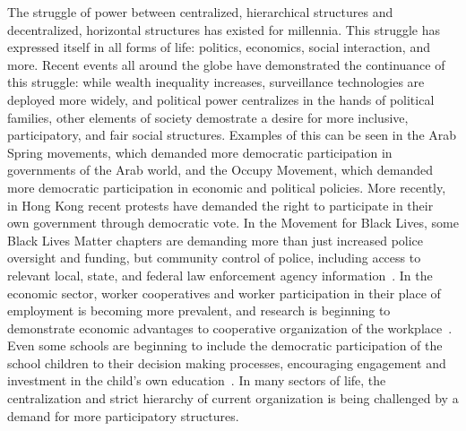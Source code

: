 The struggle of power between centralized, hierarchical structures and
decentralized, horizontal structures has existed for millennia. This struggle
has expressed itself in all forms of life: politics, economics, social
interaction, and more. Recent events all around the globe have demonstrated the
continuance of this struggle: while wealth inequality increases, surveillance
technologies are deployed more widely, and political power centralizes in the
hands of political families, other elements of society demostrate a desire for
more inclusive, participatory, and fair social structures. Examples of this can
be seen in the Arab Spring movements, which demanded more democratic
participation in governments of the Arab world, and the Occupy Movement, which
demanded more democratic participation in economic and political policies. More
recently, in Hong Kong recent protests have demanded the right to participate in
their own government through democratic vote. In the Movement for Black Lives,
some Black Lives Matter chapters are demanding more than just increased police
oversight and funding, but community control of police, including access to
relevant local, state, and federal law enforcement agency
information~\cite{m4blpolicyreforms}. In the economic sector, worker
cooperatives and worker participation in their place of employment is becoming
more prevalent, and research is beginning to demonstrate economic advantages to
cooperative organization of the
workplace~\cite{jackall19846,wright2014worker, lindenfeld1982workplace}.
Even some schools are beginning to include the democratic participation of the
school children to their decision making processes, encouraging engagement and
investment in the child's own education~\cite{pacheco2008escola}. In many
sectors of life, the centralization and strict hierarchy of current organization
is being challenged by a demand for more participatory structures.


